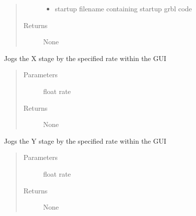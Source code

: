 \documentclass[letterpaper,10pt,english]{sphinxmanual}
\begin{document}
\begin{fulllineitems}
\begin{fulllineitems}
\begin{quote}
\begin{description}
\begin{itemize}
\item {} 
\sphinxAtStartPar
{} \textendash{} startup filename containing startup grbl code

\end{itemize}

\item[{Returns}] \leavevmode
\sphinxAtStartPar
None

\end{description}\end{quote}

\end{fulllineitems}


\begin{fulllineitems}
\label{\detokenize{index:droogCNC.TwoAxisStage.jogX}}
\sphinxAtStartPar
Jogs the X stage by the specified rate within the GUI
\begin{quote}\begin{description}
\item[{Parameters}] \leavevmode
\sphinxAtStartPar
{} \textendash{} float rate

\item[{Returns}] \leavevmode
\sphinxAtStartPar
None

\end{description}\end{quote}

\end{fulllineitems}


\begin{fulllineitems}
\label{\detokenize{index:droogCNC.TwoAxisStage.jogY}}
\sphinxAtStartPar
Jogs the Y stage by the specified rate within the GUI
\begin{quote}\begin{description}
\item[{Parameters}] \leavevmode
\sphinxAtStartPar
{} \textendash{} float rate

\item[{Returns}] \leavevmode
\sphinxAtStartPar
None


\end{description}
\end{quote}
\end{fulllineitems}
\end{fulllineitems}
\end{document}
